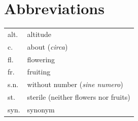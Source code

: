 \section*{Abbreviations}
\begin{tabular}{@{}ll@{}}
	alt.  & altitude \\
	c.    & about (\textit{circa}) \\
	fl.   & flowering \\
	fr.   & fruiting \\
	s.n.  & without number (\textit{sine numero}) \\
	st.   & sterile (neither flowers nor fruits) \\
	syn.  & synonym \\
\end{tabular}
